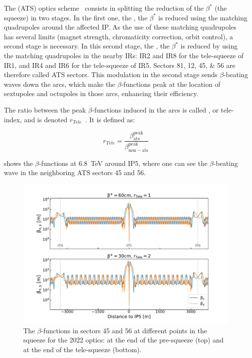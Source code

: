 The  (\acrshort{ATS}) optics scheme~\cite{CERN:Fartoukh:ATS_Report,PRAB:Fartoukh:Achromatic_Telescopic_Squeeze,IPAC:Pojer:LHC_ATS_Experience} consists in splitting the reduction of the \(\beta^{\ast}\) (the squeeze) in two stages.
In the first one, the , the \(\beta^{\ast}\) is reduced using the matching quadrupoles around the affected IP.
As the use of these matching quadrupoles has several limits (magnet strength, chromaticity correction, orbit control), a second stage is necessary.
In this second stage, the , the \(\beta^{\ast}\) is reduced by using the matching quadrupoles in the nearby IRs: IR\num{2} and IR\num{8} for the tele-squeeze of IR\num{1}, and IR\num{4} and IR\num{6} for the tele-squeeze of IR\num{5}.
Sectors \numlist{81;12;45;56} are therefore called ATS sectors.
This modulation in the second stage sends \(\beta\)-beating waves down the arcs, which make the \(\beta\)-functions peak at the location of sextupoles and octupoles in those arcs, enhancing their efficiency.

The ratio between the peak \(\beta\)-functions induced in the arcs is called , or tele-index, and is denoted \(r_{Tele}\)~\cite{CERN:Fartoukh:Round_Telescopic_Optics_LHC_Large_Telescopic_Index}.
It is defined as:

\begin{equation}
  r_{Tele} = \frac{\beta^{\mathrm{peak}}_{\mathrm{ats}}}{\beta^{\mathrm{peak}}_{\mathrm{non-ats}}}
  \label{equation:tele_index}
\end{equation}

 shows the \(\beta\)-functions at \qty{6.8}{\tera\electronvolt} around IP\num{5}, where one can see the \(\beta\)-beating wave in the neighboring ATS sectors \num{45} and \num{56}.

\begin{figure}[!hbt]
  \centering
  \includegraphics*[width=0.99\linewidth]{Figures/Optics_Measurements_Corrections_at_LHC/lhc_ats_wave.pdf}
  \caption{The \(\beta\)-functions in sectors \num{45} and \num{56} at different points in the squeeze for the \num{2022} optics: at the end of the pre-squeeze (top) and at the end of the tele-squeeze (bottom).}
  \label{figure:lhc_ats_scheme}
\end{figure}

